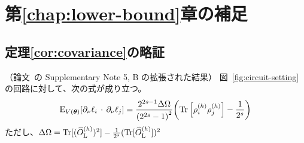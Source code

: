 \chapter{第\ref{chap:lower-bound}章の補足}



\section{定理\ref{cor:covariance}の略証}\label{sec:prf-covariance}
\begin{screen}
\begin{corollary}
    （論文~\cite{cerezo2021cost}の Supplementary Note 5, B の拡張された結果）
    図~\ref{fig:circuit-setting}の回路に対して、次の式が成り立つ。
    \begin{align}
        \operatorname{E}_{V(\boldsymbol{\theta})}[\partial_\nu\ell_i\,\cdot\,\partial_\nu\ell_j] = \frac{2^{2s-1}\Delta\Omega}{\qty(2^{2s}-1)^2}\qty(\Tr\qty[\rho_i^{(h)}\rho_j^{(h)}]-\frac{1}{2^s})
    \end{align}
    ただし、$\Delta\Omega = \operatorname{Tr}[(\widehat{O}_{\mathrm{L}}^{(h)})^2] - \frac{1}{2^s}(\operatorname{Tr}[\widehat{O}_{\mathrm{L}}^{(h)}])^2$
\end{corollary}
\end{screen}

